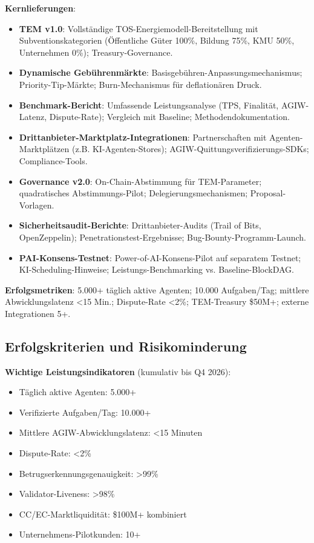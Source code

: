 \documentclass[11pt]{article}
\begin{document}
\textbf{Kernlieferungen}:
\begin{itemize}[noitemsep]
  \item \textbf{TEM v1.0}: Vollständige TOS-Energiemodell-Bereitstellung mit Subventionskategorien (Öffentliche Güter 100\%, Bildung 75\%, KMU 50\%, Unternehmen 0\%); Treasury-Governance.
  \item \textbf{Dynamische Gebührenmärkte}: Basisgebühren-Anpassungsmechanismus; Priority-Tip-Märkte; Burn-Mechanismus für deflationären Druck.
  \item \textbf{Benchmark-Bericht}: Umfassende Leistungsanalyse (TPS, Finalität, AGIW-Latenz, Dispute-Rate); Vergleich mit Baseline; Methodendokumentation.
  \item \textbf{Drittanbieter-Marktplatz-Integrationen}: Partnerschaften mit Agenten-Marktplätzen (z.B. KI-Agenten-Stores); AGIW-Quittungsverifizierungs-SDKs; Compliance-Tools.
  \item \textbf{Governance v2.0}: On-Chain-Abstimmung für TEM-Parameter; quadratisches Abstimmungs-Pilot; Delegierungsmechanismen; Proposal-Vorlagen.
  \item \textbf{Sicherheitsaudit-Berichte}: Drittanbieter-Audits (Trail of Bits, OpenZeppelin); Penetrationstest-Ergebnisse; Bug-Bounty-Programm-Launch.
  \item \textbf{PAI-Konsens-Testnet}: Power-of-AI-Konsens-Pilot auf separatem Testnet; KI-Scheduling-Hinweise; Leistungs-Benchmarking vs. Baseline-BlockDAG.
\end{itemize}

\textbf{Erfolgsmetriken}: 5.000+ täglich aktive Agenten; 10.000 Aufgaben/Tag; mittlere Abwicklungslatenz <15 Min.; Dispute-Rate <2\%; TEM-Treasury \$50M+; externe Integrationen 5+.

\subsection{Erfolgskriterien und Risikominderung}

\textbf{Wichtige Leistungsindikatoren} (kumulativ bis Q4 2026):
\begin{itemize}[noitemsep]
  \item Täglich aktive Agenten: 5.000+
  \item Verifizierte Aufgaben/Tag: 10.000+
  \item Mittlere AGIW-Abwicklungslatenz: <15 Minuten
  \item Dispute-Rate: <2\%
  \item Betrugserkennungsgenauigkeit: >99\%
  \item Validator-Liveness: >98\%
  \item CC/EC-Marktliquidität: \$100M+ kombiniert
  \item Unternehmens-Pilotkunden: 10+
\end{itemize}
\end{document}
